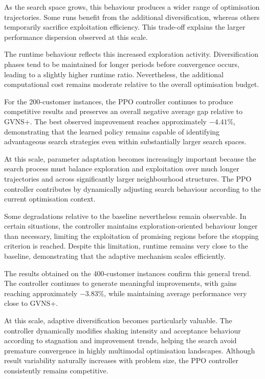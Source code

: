 As the search space grows, this behaviour produces a wider range of optimisation trajectories. Some runs benefit from the additional diversification, whereas others temporarily sacrifice exploitation efficiency. This trade-off explains the larger performance dispersion observed at this scale.

The runtime behaviour reflects this increased exploration activity. Diversification phases tend to be maintained for longer periods before convergence occurs, leading to a slightly higher runtime ratio. Nevertheless, the additional computational cost remains moderate relative to the overall optimisation budget.

For the 200-customer instances, the PPO controller continues to produce competitive results and preserves an overall negative average gap relative to GVNS+. The best observed improvement reaches approximately $-4.41\%$, demonstrating that the learned policy remains capable of identifying advantageous search strategies even within substantially larger search spaces.

At this scale, parameter adaptation becomes increasingly important because the search process must balance exploration and exploitation over much longer trajectories and across significantly larger neighbourhood structures. The PPO controller contributes by dynamically adjusting search behaviour according to the current optimisation context.

Some degradations relative to the baseline nevertheless remain observable. In certain situations, the controller maintains exploration-oriented behaviour longer than necessary, limiting the exploitation of promising regions before the stopping criterion is reached. Despite this limitation, runtime remains very close to the baseline, demonstrating that the adaptive mechanism scales efficiently.

The results obtained on the 400-customer instances confirm this general trend. The controller continues to generate meaningful improvements, with gains reaching approximately $-3.83\%$, while maintaining average performance very close to GVNS+.

At this scale, adaptive diversification becomes particularly valuable. The controller dynamically modifies shaking intensity and acceptance behaviour according to stagnation and improvement trends, helping the search avoid premature convergence in highly multimodal optimisation landscapes. Although result variability naturally increases with problem size, the PPO controller consistently remains competitive.

